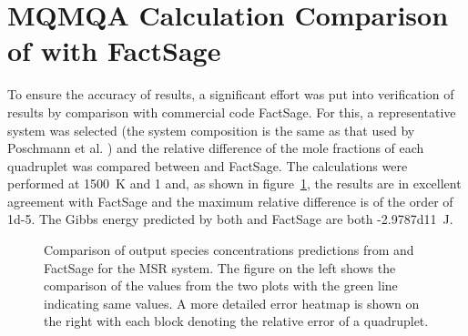 \section{MQMQA Calculation Comparison of {\GEM} with FactSage}
To ensure the accuracy of results, a significant effort was put into verification of {\GEM} results by comparison with commercial code FactSage. For this, a representative system was selected (the system composition is the same as that used by Poschmann et al. \cite{Poschmann:2021ab}) and the relative difference of the mole fractions of each quadruplet was compared between {\GEM} and FactSage. The calculations were performed at \SI{1500}{\kelvin} and \SI{1}{\atmosphere} and, as shown in figure~\ref{fig:verif}, the results are in excellent agreement with FactSage and the maximum relative difference is of the order of \num{1d-5}. The Gibbs energy predicted by both {\GEM} and FactSage are both \SI{-2.9787d11}{\joule}. 
\begin{figure}[!ht]
    \hfill
    \caption[Comparison of output species concentrations predictions from {\GEM} and FactSage for the MSR system.]{Comparison of output species concentrations predictions from {\GEM} and FactSage for the MSR system. The figure on the left shows the comparison of the values from the two plots with the green line indicating same values. A more detailed error heatmap is shown on the right with each block denoting the relative error of a quadruplet.}
    \label{fig:verif}
\end{figure}


